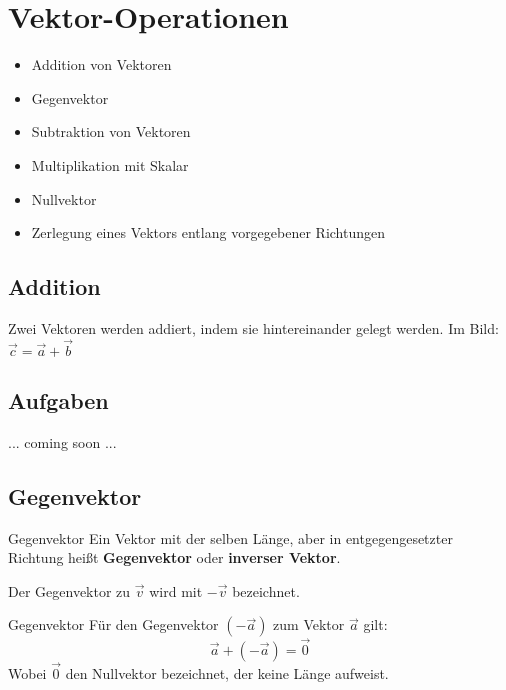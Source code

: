 \section{Vektor-Operationen}

\begin{itemize}
\item Addition von Vektoren
\item Gegenvektor
\item Subtraktion von Vektoren
\item Multiplikation mit Skalar
\item Nullvektor
\item Zerlegung eines Vektors entlang vorgegebener Richtungen
\end{itemize}

\newpage

\subsection{Addition}

Zwei Vektoren werden addiert, indem sie hintereinander gelegt
werden. Im Bild: $\vec{c} = \vec{a} + \vec{b}$


\subsection*{Aufgaben}
... coming soon ...

\newpage


\subsection{Gegenvektor}

\begin{definition}{Gegenvektor}{}
  Ein Vektor mit der selben Länge, aber in entgegengesetzter Richtung
  heißt \textbf{Gegenvektor} oder \textbf{inverser Vektor}.

  Der Gegenvektor zu $\vec{v}$ wird mit $-\vec{v}$ bezeichnet.
\end{definition}

\begin{bemerkung}{Gegenvektor}{}
  Für den Gegenvektor $(-\vec{a})$ zum Vektor $\vec{a}$ gilt:
  $$\vec{a} + (-\vec{a}) = \vec{0}$$
Wobei $\vec{0}$ den Nullvektor bezeichnet, der keine Länge aufweist.
  
\end{bemerkung}


